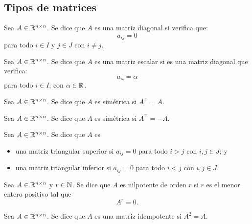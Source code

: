\documentclass[a4,11pt]{aleph-notas}
\begin{document}
\subsection{Tipos de matrices}

\begin{defi}
    Sea $A\in \mathbb{R}^{n \times n}$. Se dice que $A$ es una matriz diagonal si verifica que:
    \[ 
        a_{ij} = 0
    \]
    para todo $i\in I$ y $j\in J$ con $i\neq j$.
\end{defi}

\begin{defi}
    Sea $A\in \mathbb{R}^{n \times n}$. Se dice que $A$ es una matriz escalar si es una matriz diagonal que verifica:
    \[ 
        a_{ii} = \alpha
    \]
    para todo $i\in I$, con $\alpha\in\mathbb{R}$.
\end{defi}

\begin{defi}
    Sea $A\in \mathbb{R}^{n \times n}$. Se dice que $A$ es simétrica si $A^\intercal = A$.
\end{defi}

\begin{defi}
    Sea $A\in \mathbb{R}^{n \times n}$. Se dice que $A$ es simétrica si $A^\intercal = -A$.
\end{defi}

\begin{defi}
    Sea $A\in \mathbb{R}^{n \times n}$. Se dice que $A$ es
    \begin{itemize}
    \item 
        una matriz triangular superior si $a_{ij} = 0 $ para todo $i>j$ con $i,j \in J$; y
    \item 
        una matriz triangular inferior si $a_{ij} = 0 $ para todo $i<j$ con $i,j \in J$.
    \end{itemize}
\end{defi}

\begin{defi}
    Sea $A\in \mathbb{R}^{n \times n}$ y $r \in \mathbb{N}$. Se dice que $A$ es nilpotente de orden $r$ si $r$ es el menor entero positivo tal que
    \[ 
        A^r = 0.
    \]
\end{defi}

\begin{defi}
    Sea $A\in \mathbb{R}^{n \times n}$. Se dice que $A$ es una matriz idempotente si $A^2 = A$.
\end{defi}
\end{document}
